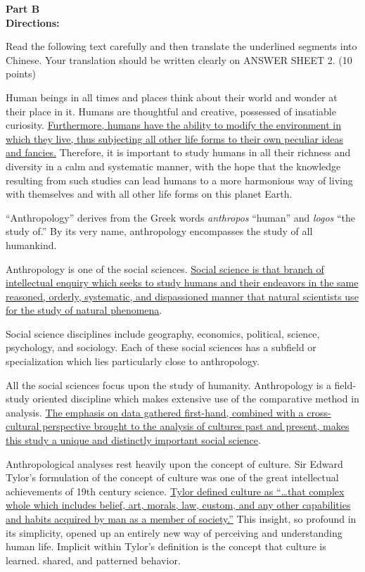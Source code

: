 \noindent
\textbf{Part B}\\
\textbf{Directions:}\\
{Read the following text carefully and then translate the
	underlined segments into Chinese. Your translation should be written
	clearly on ANSWER SHEET 2. (10 points)


\TiGanSpace



Human beings in all times and places think about their world and wonder
at their place in it. Humans are thoughtful and creative, possessed of
insatiable curiosity. \transnum \uline{Furthermore, humans have the
	ability to modify the environment in which they live, thus subjecting
	all other life forms to their own peculiar ideas and fancies.}
Therefore, it is important to study humans in all their richness and
diversity in a calm and systematic manner, with the hope that the
knowledge resulting from such studies can lead humans to a more
harmonious way of living with themselves and with all other life forms
on this planet Earth.

``Anthropology'' derives from the Greek words \emph{anthropos} ``human''
and \emph{logos} ``the study of.'' By its very name, anthropology
encompasses the study of all humankind.

Anthropology is one of the social sciences. \transnum \uline{Social
	science is that branch of intellectual enquiry which seeks to study
	humans and their endeavors in the same reasoned, orderly, systematic,
	and dispassioned manner that natural scientists use for the study of
	natural phenomena}.

Social science disciplines include geography, economics, political,
science, psychology, and sociology. Each of these social sciences has a
subfield or specialization which lies particularly close to
anthropology.

All the social sciences focus upon the study of humanity. Anthropology
is a field-study oriented discipline which makes extensive use of the
comparative method in analysis. \transnum \uline{The emphasis on data
	gathered first-hand, combined with a cross-cultural perspective brought
	to the analysis of cultures past and present, makes this study a unique
	and distinctly important social science}.

Anthropological analyses rest heavily upon the concept of culture. Sir
Edward Tylor's formulation of the concept of culture was one of the
great intellectual achievements of 19th century
science. \transnum \uline{Tylor defined culture as ``\ldots that complex
	whole which includes belief, art, morals, law, custom, and any other
	capabilities and habits acquired by man as a member of society.''} This
insight, so profound in its simplicity, opened up an entirely new way of
perceiving and understanding human life. Implicit within Tylor's
definition is the concept that culture is learned. shared, and patterned
behavior.

}
